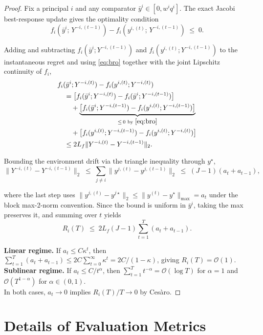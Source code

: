 \documentclass{article}
\begin{document}
\begin{proof}
Fix a principal $i$ and any comparator $\bar y^i\in[0,w^i q^i]$. The exact 
Jacobi best-response update gives the optimality condition
\begin{equation}\label{eq:bro}
f_i(\bar y^i;\,Y^{-i,(t-1)}) - f_i(y^{i,(t)};\,Y^{-i,(t-1)}) \;\le\; 0.
\end{equation}

Adding and subtracting $f_i(\bar y^i;Y^{-i,(t-1)})$ and 
$f_i(y^{i,(t)};Y^{-i,(t-1)})$ to the instantaneous regret and using 
\eqref{eq:bro} together with the joint Lipschitz continuity of $f_i$,
\begin{align*}
& f_i(\bar y^i;Y^{-i,(t)}) - f_i(y^{i,(t)};Y^{-i,(t)})\\
&\quad=\bigl[f_i(\bar y^i;Y^{-i,(t)}) - f_i(\bar y^i;Y^{-i,(t-1)})\bigr]\\
&\qquad+\underbrace{\bigl[f_i(\bar y^i;Y^{-i,(t-1)}) - f_i(y^{i,(t)};Y^{-i,(t-1)})\bigr]}_{\le\,0\text{ by }\eqref{eq:bro}}\\
&\qquad+\bigl[f_i(y^{i,(t)};Y^{-i,(t-1)}) - f_i(y^{i,(t)};Y^{-i,(t)})\bigr]\\
&\quad\le 2L_f\|Y^{-i,(t)}-Y^{-i,(t-1)}\|_2.
\end{align*}

Bounding the environment drift via the triangle inequality through $y^\star$,
\[
\|Y^{-i,(t)}-Y^{-i,(t-1)}\|_2
\;\le\;\sum_{j\ne i}\|y^{j,(t)}-y^{j,(t-1)}\|_2
\;\le\;(J-1)(a_t+a_{t-1}),
\]

where the last step uses 
$\|y^{j,(t)}-y^{j\star}\|_2\le \|y^{(t)}-y^\star\|_{\max}=a_t$
under the block max-2-norm convention. Since the bound is uniform in 
$\bar y^i$, taking the max preserves it, and summing over $t$ yields
\[
R_i(T) \;\le\; 2L_f(J-1)\sum_{t=1}^T(a_t+a_{t-1}).
\]

\textbf{Linear regime.} If $a_t\le C\kappa^t$, then 
$\sum_{t=1}^T(a_t+a_{t-1})\le 2C\sum_{t=0}^\infty\kappa^t = 2C/(1-\kappa)$, 
giving $R_i(T)=\mathcal O(1)$.\\
\textbf{Sublinear regime.} If $a_t\le C/t^\alpha$, then 
$\sum_{t=1}^T t^{-\alpha}=\mathcal O(\log T)$ for $\alpha=1$ and 
$\mathcal O(T^{1-\alpha})$ for $\alpha\in(0,1)$.\\
In both cases, $a_t\to 0$ implies $R_i(T)/T\to 0$ by Cesàro.
\end{proof}

\section{Details of Evaluation Metrics}
\end{document}
